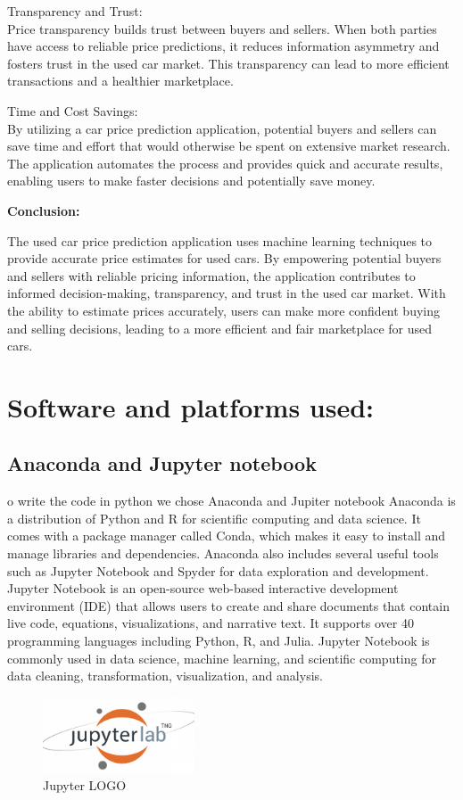 \documentclass{article}
\begin{document}
\begin{flushleft}
\item [\ding{90}]Transparency and Trust: \\
Price transparency builds trust between buyers and sellers. When both parties have access to reliable price predictions, it reduces information asymmetry and fosters trust in the used car market. This transparency can lead to more efficient transactions and a healthier marketplace.

\item [\ding{90}]Time and Cost Savings: \\
By utilizing a car price prediction application, potential buyers and sellers can save time and effort that would otherwise be spent on extensive market research. The application automates the process and provides quick and accurate results, enabling users to make faster decisions and potentially save money.

\textbf{Conclusion:}

The used car price prediction application uses machine learning techniques to provide accurate price estimates for used cars. By empowering potential buyers and sellers with reliable pricing information, the application contributes to informed decision-making, transparency, and trust in the used car market. With the ability to estimate prices accurately, users can make more confident buying and selling decisions, leading to a more efficient and fair marketplace for used cars.
\newpage
\end{flushleft}

\section{Software and platforms used:}
\subsection{Anaconda and Jupyter notebook}
o write the code in python we chose Anaconda and Jupiter notebook Anaconda is a distribution of Python and R for scientific computing and data science. It comes with a package
manager called Conda, which makes it easy to install and manage libraries and dependencies.
Anaconda also includes several useful tools such as Jupyter Notebook and Spyder for data
exploration and development. Jupyter Notebook is an open-source web-based interactive development environment (IDE) that allows users to create and share documents that contain
live code, equations, visualizations, and narrative text. It supports over 40 programming languages including Python, R, and Julia. Jupyter Notebook is commonly used in data science,
machine learning, and scientific computing for data cleaning, transformation, visualization,
and analysis.
\begin{figure}[h]
    \centering
    \includegraphics[width=0.4\textwidth]{jupyter.png}
    \caption{Jupyter LOGO}
    \label{fig:my_label}
\end{figure}
\end{document}
